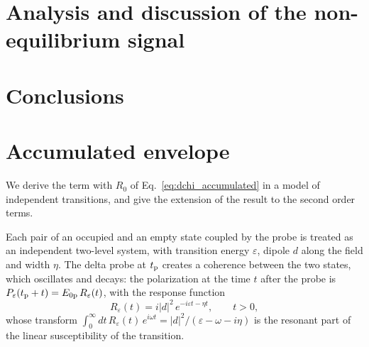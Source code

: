 \documentclass[aps,prb,reprint,superscriptaddress,amsmath,amssymb]{revtex4-2}
\begin{document}
\section{Analysis and discussion of the non-equilibrium signal}
\label{sec:analysis}


\section{Conclusions}
\label{sec:conclusions}



\appendix
\section{Accumulated envelope}
\label{app:envelope}

We derive the term with $R_0$ of Eq.~\eqref{eq:dchi_accumulated} in a model of independent transitions, and give the
extension of the result to the second order terms.

Each pair of an occupied and an empty state coupled by the probe is treated as an independent two-level system, with
transition energy $\varepsilon$, dipole $d$ along the field and width $\eta$. The delta probe at $t_{\mathrm{p}}$ creates a
coherence between the two states, which oscillates and decays: the polarization at the time $t$ after the probe is
$P_\varepsilon(t_{\mathrm{p}}+t) = E_{0\mathrm{p}}\,R_\varepsilon(t)$, with the response function
\begin{equation}
R_\varepsilon(t) = i|d|^2\,e^{-i\varepsilon t-\eta t} , \qquad t>0 ,
\label{eq:R_eps}
\end{equation}
whose transform $\int_0^\infty dt\,R_\varepsilon(t)\,e^{i\omega t} = |d|^2/(\varepsilon-\omega-i\eta)$ is the resonant
part of the linear susceptibility of the transition.
\end{document}
